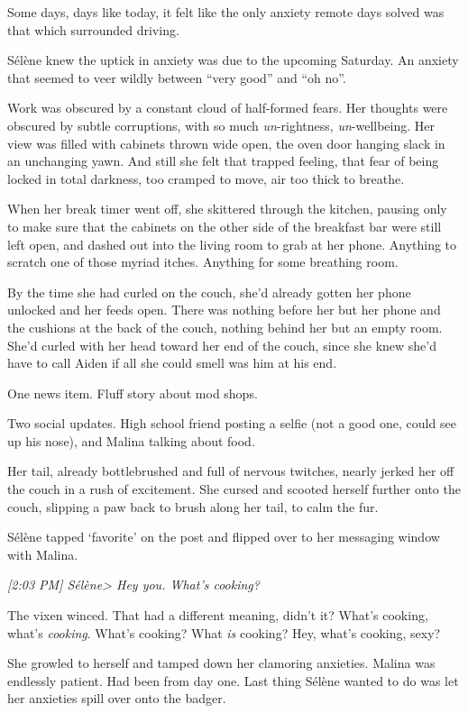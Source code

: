 Some days, days like today, it felt like the only anxiety remote days solved was that which surrounded driving.

Sélène knew the uptick in anxiety was due to the upcoming Saturday. An anxiety that seemed to veer wildly between ``very good'' and ``oh no''.

Work was obscured by a constant cloud of half-formed fears. Her thoughts were obscured by subtle corruptions, with so much \emph{un}-rightness, \emph{un}-wellbeing. Her view was filled with cabinets thrown wide open, the oven door hanging slack in an unchanging yawn. And still she felt that trapped feeling, that fear of being locked in total darkness, too cramped to move, air too thick to breathe.

When her break timer went off, she skittered through the kitchen, pausing only to make sure that the cabinets on the other side of the breakfast bar were still left open, and dashed out into the living room to grab at her phone. Anything to scratch one of those myriad itches. Anything for some breathing room.

By the time she had curled on the couch, she'd already gotten her phone unlocked and her feeds open. There was nothing before her but her phone and the cushions at the back of the couch, nothing behind her but an empty room. She'd curled with her head toward her end of the couch, since she knew she'd have to call Aiden if all she could smell was him at his end.

One news item. Fluff story about mod shops.

Two social updates. High school friend posting a selfie (not a good one, could see up his nose), and Malina talking about food.

Her tail, already bottlebrushed and full of nervous twitches, nearly jerked her off the couch in a rush of excitement. She cursed and scooted herself further onto the couch, slipping a paw back to brush along her tail, to calm the fur.

Sélène tapped `favorite' on the post and flipped over to her messaging window with Malina.

\emph{{[}2:03 PM{]} Sélène\textgreater{} Hey you. What's cooking?}

The vixen winced. That had a different meaning, didn't it? What's cooking, what's \emph{cooking}. What's cooking? What \emph{is} cooking? Hey, what's cooking, sexy?

She growled to herself and tamped down her clamoring anxieties. Malina was endlessly patient. Had been from day one. Last thing Sélène wanted to do was let her anxieties spill over onto the badger.

